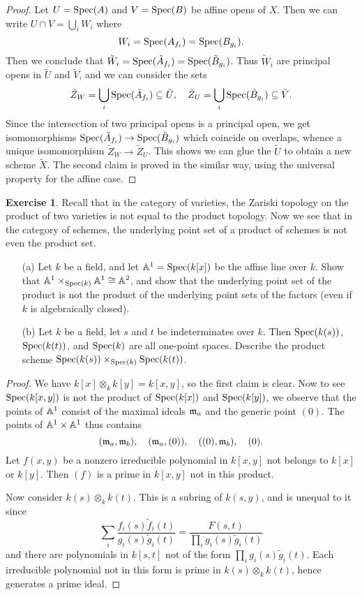 \documentclass[11pt]{book}
\theoremstyle{definition}
\newtheorem{exercise}{Exercise}[section]
\begin{document}
\begin{proof}
Let $U=\mathrm{Spec}(A)$ and $V=\mathrm{Spec}(B)$ be affine opens of $X$. Then we can write $U\cap V=\bigcup_iW_i$ where
\[W_i=\mathrm{Spec}(A_{f_i})=\mathrm{Spec}(B_{g_i}).\]
Then we conclude that $\tilde{W}_i=\mathrm{Spec}(\tilde{A}_{f_i})=\mathrm{Spec}(\tilde{B}_{g_i})$. Thus $\tilde{W}_i$ are principal opens in $\tilde{U}$ and $\tilde{V}$, and we can consider the sets
\[\tilde{Z}_W=\bigcup_i\mathrm{Spec}(\tilde{A}_{f_i})\subseteq\tilde{U},\quad\tilde{Z}_U=\bigcup_i\mathrm{Spec}(\tilde{B}_{g_i})\subseteq\tilde{V}.\]
Since the intersection of two principal opens is a principal open, we get isomomorphisms $\mathrm{Spec}(\tilde{A}_{f_i})\to\mathrm{Spec}(\tilde{B}_{g_i})$ which coincide on overlaps, whence a unique isomomorphism $\tilde{Z}_W\to\tilde{Z}_U$. This shows we can glue the $\tilde{U}$ to obtain a new scheme $\tilde{X}$. The second claim is proved in the similar way, using the universal property for the affine case.
\end{proof}
\begin{exercise}
Recall that in the category of varieties, the Zariski topology on the product of two varieties is not equal to the product topology. Now we see that in the category of schemes, the underlying point set of a product of schemes is not even the product set.
\begin{itemize}
\item[(a)] Let $k$ be a field, and let $\mathbb{A}^1=\mathrm{Spec}(k[x])$ be the affine line over $k$. Show that $\mathbb{A}^1\times_{\mathrm{Spec}(k)}\mathbb{A}^1\cong\mathbb{A}^2$, and show that the underlying point set of the product is not the product of the underlying point sets of the factors (even if $k$ is algebraically closed).
\item[(b)] Let $k$ be a field, let $s$ and $t$ be indeterminates over $k$. Then $\mathrm{Spec}(k(s))$, $\mathrm{Spec}(k(t))$, and $\mathrm{Spec}(k)$ are all one-point spaces. Describe the product scheme $\mathrm{Spec}(k(s))\times_{\mathrm{Spec}(k)}\mathrm{Spec}(k(t))$.
\end{itemize}
\end{exercise}
\begin{proof}
We have $k[x]\otimes_kk[y]=k[x,y]$, so the first claim is clear. Now to see $\mathrm{Spec}(k[x,y])$ is not the product of $\mathrm{Spec}(k[x])$ and $\mathrm{Spec}(k[y])$, we observe that the points of $\mathbb{A}^1$ consist of the maximal ideals $\mathfrak{m}_a$ and the generic point $(0)$. The points of $\mathbb{A}^1\times\mathbb{A}^1$ thus contains
\[(\mathfrak{m}_a,\mathfrak{m}_b),\quad (\mathfrak{m}_a,(0)),\quad ((0),\mathfrak{m}_b),\quad (0).\]
Let $f(x,y)$ be a nonzero irreducible polynomial in $k[x,y]$ not belongs to $k[x]$ or $k[y]$. Then $(f)$ is a prime in $k[x,y]$ not in this product.\par
Now consider $k(s)\otimes_kk(t)$. This is a subring of $k(s,y)$, and is unequal to it since
\[\sum_i\frac{f_i(s)\tilde{f}_i(t)}{g_i(s)\tilde{g}_i(t)}=\frac{F(s,t)}{\prod_ig_i(s)\tilde{g}_i(t)}\]
and there are polynomials in $k[s,t]$ not of the form $\prod_ig_i(s)\tilde{g}_i(t)$. Each irreducible polynomial not in this form is prime in $k(s)\otimes_kk(t)$, hence generates a prime ideal.
\end{proof}
\end{document}
